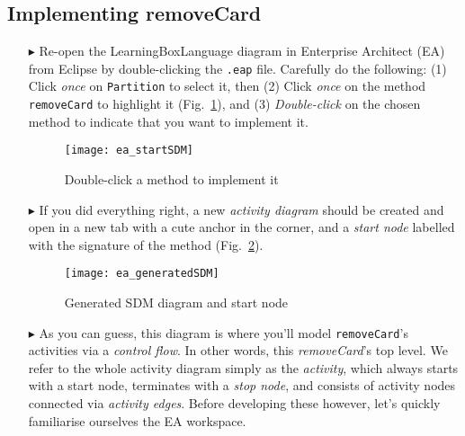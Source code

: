 \newpage
\hypertarget{remCard vis}{}
\subsection{Implementing removeCard}
\visHeader

\begin{itemize}

\item[$\blacktriangleright$] Re-open the LearningBoxLanguage diagram in Enterprise Architect (EA) from Eclipse by double-clicking the \texttt{.eap}
file. Carefully do the following: (1) Click \emph{once} on \texttt{Partition} to select it, then (2) Click \emph{once} on the method
\texttt{removeCard} to highlight it (Fig.~\ref{fig:sdm_start}), and (3) \emph{Double-click} on the chosen method to indicate that you want to implement it.

\begin{figure}[htp]
\begin{center}
  \texttt{[image: ea\_startSDM]}
  \caption{Double-click a method to implement it}  
  \label{fig:sdm_start}
\end{center}
\end{figure}
 
\item[$\blacktriangleright$] If you did everything right, a new \emph{activity diagram} should be created and open in a new tab with a cute anchor in
the corner, and a \emph{start node} labelled with the signature of the method (Fig.~\ref{fig:sdm_skeleton}).  

\begin{figure}[htp]
\begin{center}
 \texttt{[image: ea\_generatedSDM]}
  \caption{Generated SDM diagram and start node}  
  \label{fig:sdm_skeleton}
\end{center}
\end{figure}

\vspace{0.5cm}

\item[$\blacktriangleright$] As you can guess, this diagram is where you'll model \texttt{removeCard}'s activities via a \emph{control flow}. In other words,
this \emph{removeCard}'s top level. We refer to the whole activity diagram simply as the \emph{activity}, which always starts with a start node, terminates with
a \emph{stop node}, and consists of activity nodes connected via \emph{activity edges}. Before developing these however, let's quickly familiarise ourselves the
EA workspace.


\end{itemize}

